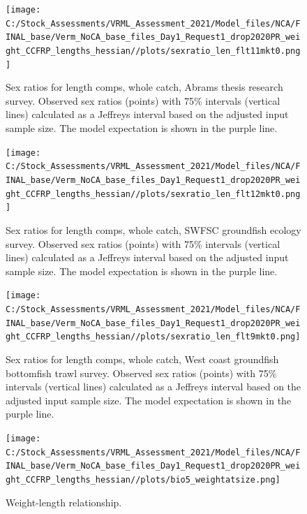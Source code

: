 \documentclass[
  english,
  a4paper,
]{article}
\begin{document}
\FloatBarrier

\begin{figure}
\centering
\texttt{[image: C:/Stock\_Assessments/VRML\_Assessment\_2021/Model\_files/NCA/FINAL\_base/Verm\_NoCA\_base\_files\_Day1\_Request1\_drop2020PR\_weight\_CCFRP\_lengths\_hessian//plots/sexratio\_len\_flt11mkt0.png]}
\caption{Sex ratios for length comps, whole catch, Abrams thesis research survey. Observed sex ratios (points) with 75\% intervals (vertical lines) calculated as a Jeffreys interval based on the adjusted input sample size. The model expectation is shown in the purple line.\label{fig:sexratio-ABRAMS-RESEARCH}}
\end{figure}

\begin{figure}
\centering
\texttt{[image: C:/Stock\_Assessments/VRML\_Assessment\_2021/Model\_files/NCA/FINAL\_base/Verm\_NoCA\_base\_files\_Day1\_Request1\_drop2020PR\_weight\_CCFRP\_lengths\_hessian//plots/sexratio\_len\_flt12mkt0.png]}
\caption{Sex ratios for length comps, whole catch, SWFSC groundfish ecology survey. Observed sex ratios (points) with 75\% intervals (vertical lines) calculated as a Jeffreys interval based on the adjusted input sample size. The model expectation is shown in the purple line.\label{fig:sexratio-SWFSC-GF-ECOL}}
\end{figure}

\begin{figure}
\centering
\texttt{[image: C:/Stock\_Assessments/VRML\_Assessment\_2021/Model\_files/NCA/FINAL\_base/Verm\_NoCA\_base\_files\_Day1\_Request1\_drop2020PR\_weight\_CCFRP\_lengths\_hessian//plots/sexratio\_len\_flt9mkt0.png]}
\caption{Sex ratios for length comps, whole catch, West coast groundfish bottomfish trawl survey. Observed sex ratios (points) with 75\% intervals (vertical lines) calculated as a Jeffreys interval based on the adjusted input sample size. The model expectation is shown in the purple line.\label{fig:sexratio-NWFSC-TWL}}
\end{figure}

\FloatBarrier

\begin{figure}
\centering
\texttt{[image: C:/Stock\_Assessments/VRML\_Assessment\_2021/Model\_files/NCA/FINAL\_base/Verm\_NoCA\_base\_files\_Day1\_Request1\_drop2020PR\_weight\_CCFRP\_lengths\_hessian//plots/bio5\_weightatsize.png]}
\caption{Weight-length relationship.\label{fig:weightlength}}
\end{figure}
\end{document}
